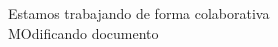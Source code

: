 \documentclass{article}
\begin{document}
Estamos trabajando de forma colaborativa\\
MOdificando documento 
\end{document}
